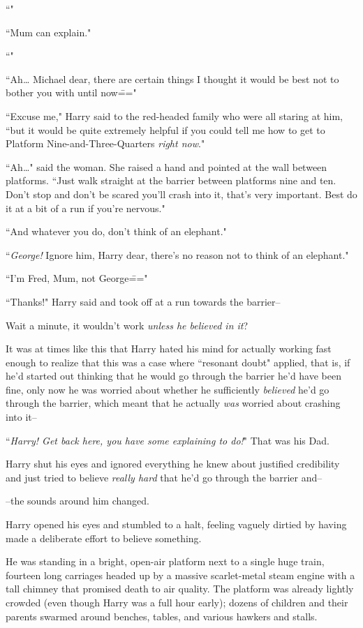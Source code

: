 ``"

``Mum can explain."

``"

``Ah{\ldots} Michael dear, there are certain things I thought it would be best not to bother you with until now\==="

``Excuse me," Harry said to the red-headed family who were all staring at him, ``but it would be quite extremely helpful if you could tell me how to get to Platform Nine-and-Three-Quarters \emph{right now}."

``Ah{\ldots}" said the woman. She raised a hand and pointed at the wall between platforms. ``Just walk straight at the barrier between platforms nine and ten. Don't stop and don't be scared you'll crash into it, that's very important. Best do it at a bit of a run if you're nervous."

``And whatever you do, don't think of an elephant."

``\emph{George!} Ignore him, Harry dear, there's no reason not to think of an elephant."

``I'm Fred, Mum, not George\==="

``Thanks!" Harry said and took off at a run towards the barrier\---

Wait a minute, it wouldn't work \emph{unless he believed in it}?

It was at times like this that Harry hated his mind for actually working fast enough to realize that this was a case where ``resonant doubt" applied, that is, if he'd started out thinking that he would go through the barrier he'd have been fine, only now he was worried about whether he sufficiently \emph{believed} he'd go through the barrier, which meant that he actually \emph{was} worried about crashing into it\---

``\emph{Harry! Get back here, you have some explaining to do!}" That was his Dad.

Harry shut his eyes and ignored everything he knew about justified credibility and just tried to believe \emph{really hard} that he'd go through the barrier and\---

\---the sounds around him changed.

Harry opened his eyes and stumbled to a halt, feeling vaguely dirtied by having made a deliberate effort to believe something.

He was standing in a bright, open-air platform next to a single huge train, fourteen long carriages headed up by a massive scarlet-metal steam engine with a tall chimney that promised death to air quality. The platform was already lightly crowded (even though Harry was a full hour early); dozens of children and their parents swarmed around benches, tables, and various hawkers and stalls.

